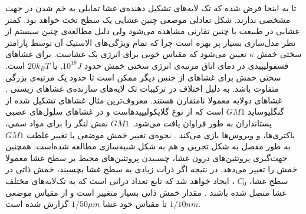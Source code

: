 تا به اینجا فرض شده که تک لایه‌های تشکیل دهنده‌ی غشا تمایلی به خم شدن در جهت مشخصی ندارند. شکل تعادلی موضعی چنین غشایی یک سطح تخت خواهد بود. کمتر غشایی در طبیعت با چنین تقارنی مشاهده می‌شود ولی دلیل مطالعه‌ی چنین سیستم از نظر مدل‌سازی بسیار پر بهره است چرا که تمام ویژگی‌های الاستیک آن توسط پارامتر سختی خمش
$\kappa$
تعیین می‌شود که مقیاس خوبی برای انرژی یک غشاست. برای غشاهای فسفولیپیدی در دمای اتاق مرتبه‌ی انرژی سختی خمش حدود
$10^{19}J$,
یا
$20k_BT$
است. سختی خمش برای غشاهای از جنس دیگر ممکن است تا حدود یک مرتبه‌ی بزرگی متفاوت باشد. به دلیل اختلاف در ترکیبات تک لایه‌های سازنده‌ی غشاهای زیستی
\cite{Meer2008},
 غشاهای دولایه معمولا نامتقارن هستند. معروف‌ترین مثال غشاهای تشکیل شده از گنگلیوساید 
$GM1$  
است که از نوع گلایکولیپید‌هاست  
و در غشاهای سلول‌های عصبی پستانداران به طور فراوان یافت می‌شود. 
$GM1$
نقش لنگر را برای مواد سمی، باکتری‌ها، و ویروس‌ها بازی می‌کند
\cite{Ewers2010}.
نحوه‌ی تغییر خمش موضعی با تغییر غلظت 
$GM1$
به طور مفصل به شکل تجربی
\cite{Bhatia2018, Raktim2018}
و هم به شکل شبیه‌سازی
\cite{Raktim2018, Sreekumari2018}
مطالعه شده‌است. همچنین جهت‌گیری پروتئین‌های درون غشا، چسبیدن پروتئین‌های محیط بر سطح غشا معمولا خمش را تغییر می‌دهد. در نتیجه اگر ذرات زیادی به سطح غشا بچسبند، خمش ذاتی در سطح غشا،
$C_0$
، ایجاد خواهد شد
\cite{Lipowsky2002}
که تابع تعداد ذراتی‌ است که به تک‌لایه‌های مختلف غشا متصل شده باشند
\cite{Breidenich2000}.
 مقدار خمش ذاتی بسیار متغییر است و از مقیاس موضعی 
$1/10nm$
تا مقیاس خود غشا
$1/50\mu m$
گزارش شده است.

